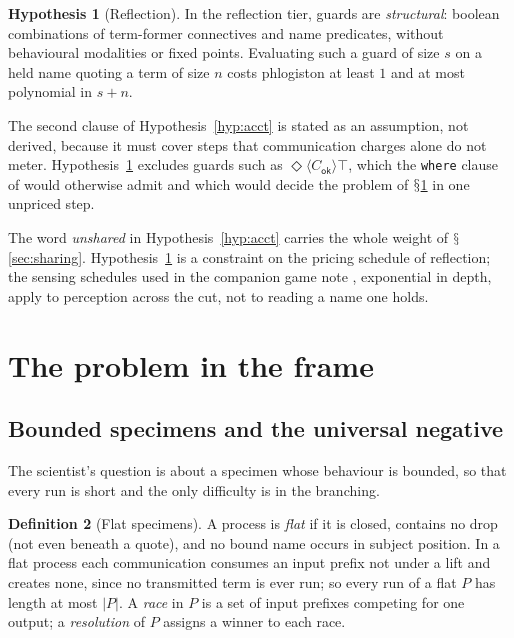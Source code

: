 \documentclass[11pt]{article}
\theoremstyle{definition}
\newtheorem{definition}{Definition}[section]
\newtheorem{hypothesis}[definition]{Hypothesis}
\theoremstyle{plain}
\theoremstyle{remark}
\DeclareRobustCommand{\S}{\ifmmode\mathsection\else$\mathsection$\fi}
\newcommand{\ok}{\mathsf{ok}}
\begin{document}
\begin{hypothesis}[Reflection]\label{hyp:refl}
In the reflection tier, guards are \emph{structural}: boolean
combinations of term-former connectives and name predicates, without
behavioural modalities or fixed points. Evaluating such a guard of size
$s$ on a held name quoting a term of size $n$ costs phlogiston at least
$1$ and at most polynomial in $s + n$.
\end{hypothesis}

The second clause of Hypothesis~\ref{hyp:acct} is stated as an
assumption, not derived, because it must cover steps that communication
charges alone do not meter. Hypothesis~\ref{hyp:refl} excludes guards
such as $\Diamond\langle C_\ok\rangle\top$, which the \texttt{where}
clause of \cite{Omnibus} would otherwise admit and which would decide the
problem of \S\ref{sec:problem} in one unpriced step.

The word \emph{unshared} in Hypothesis~\ref{hyp:acct} carries the whole
weight of \S\ref{sec:sharing}. Hypothesis~\ref{hyp:refl} is a constraint
on the pricing schedule of reflection; the sensing schedules used in the
companion game note \cite{GameNote}, exponential in depth, apply to
perception across the cut, not to reading a name one holds.
\section{The problem in the frame}\label{sec:problem}

\subsection{Bounded specimens and the universal negative}\label{sec:absence}

The scientist's question is about a specimen whose behaviour is bounded,
so that every run is short and the only difficulty is in the branching.

\begin{definition}[Flat specimens]\label{def:flat}
A process is \emph{flat} if it is closed, contains no drop (not even
beneath a quote), and no bound name occurs in subject position. In a flat
process each communication consumes an input prefix not under a lift and
creates none, since no transmitted term is ever run; so every run of a
flat $P$ has length at most $|P|$. A \emph{race} in $P$ is a set of input
prefixes competing for one output; a \emph{resolution} of $P$ assigns a
winner to each race.
\end{definition}
\end{document}
